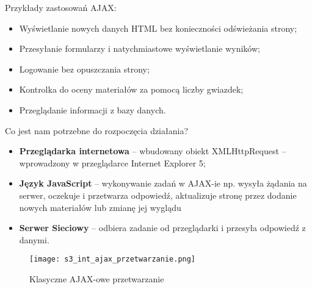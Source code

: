 Przykłady zastosowań AJAX:
\begin{itemize}
\item Wyświetlanie nowych danych HTML bez konieczności odświeżania strony;
\item Przesyłanie formularzy i natychmiastowe wyświetlanie wyników;
\item Logowanie bez opuszczania strony;
\item Kontrolka do oceny materiałów za pomocą liczby gwiazdek;
\item Przeglądanie informacji z bazy danych.  
\end{itemize}

Co jest nam potrzebne do rozpoczęcia działania? 
\begin{itemize}
\item \textbf{Przeglądarka internetowa} -- wbudowany obiekt XMLHttpRequest -- wprowadzony w przeglądarce Internet Explorer 5;
\item \textbf{Język JavaScript} -- wykonywanie zadań w AJAX-ie np. wysyła żądania na serwer, oczekuje i przetwarza odpowiedź, aktualizuje stronę przez dodanie nowych materiałów lub zmianę jej wyglądu
\item \textbf{Serwer Sieciowy} -- odbiera zadanie od przeglądarki i przesyła odpowiedź z danymi.
\end{itemize}
\begin{figure}[H]
\centering
\caption{Klasyczne AJAX-owe przetwarzanie}
\texttt{[image: s3\_int\_ajax\_przetwarzanie.png]}
\end{figure}

